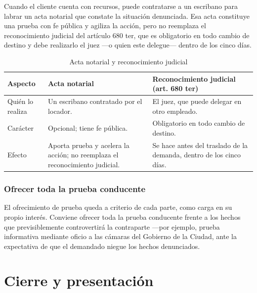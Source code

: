 \documentclass[12pt,oneside]{book}
\begin{document}
Cuando el cliente cuenta con recursos, puede contratarse a un escribano para labrar un acta notarial que constate la situación denunciada. Esa acta constituye una prueba con fe pública y agiliza la acción, pero no reemplaza el reconocimiento judicial del artículo 680 ter, que es obligatorio en todo cambio de destino y debe realizarlo el juez —o quien este delegue— dentro de los cinco días.

\begin{table}[H]
\centering
\caption{Acta notarial y reconocimiento judicial}
\begin{tabular}{@{}p{2.6cm}p{5.6cm}p{5.6cm}@{}}
\toprule
\textbf{Aspecto} & \textbf{Acta notarial} & \textbf{Reconocimiento judicial (art. 680 ter)} \\
\midrule
Quién lo realiza & Un escribano contratado por el locador. & El juez, que puede delegar en otro empleado. \\
Carácter & Opcional; tiene fe pública. & Obligatorio en todo cambio de destino. \\
Efecto & Aporta prueba y acelera la acción; no reemplaza el reconocimiento judicial. & Se hace antes del traslado de la demanda, dentro de los cinco días. \\
\bottomrule
\end{tabular}
\end{table}

\subsection*{Ofrecer toda la prueba conducente}

El ofrecimiento de prueba queda a criterio de cada parte, como carga en su propio interés. Conviene ofrecer toda la prueba conducente frente a los hechos que previsiblemente controvertirá la contraparte —por ejemplo, prueba informativa mediante oficio a las cámaras del Gobierno de la Ciudad, ante la expectativa de que el demandado niegue los hechos denunciados.

\clearpage

\chapter{Cierre y presentación}
\end{document}
